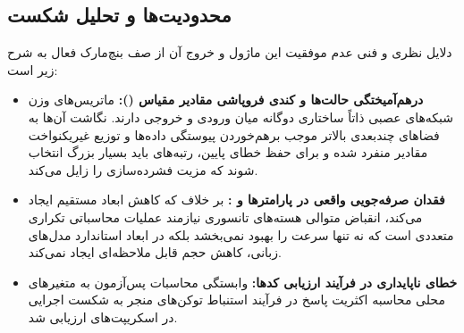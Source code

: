 \subsection{محدودیت‌ها و تحلیل شکست}
دلایل نظری و فنی عدم موفقیت این ماژول و خروج آن از صف بنچ‌مارک فعال به شرح زیر است:
\begin{itemize}
    \item \textbf{درهم‌آمیختگی حالت‌ها و کندی فروپاشی مقادیر مقیاس ():} ماتریس‌های وزن شبکه‌های عصبی ذاتاً ساختاری دوگانه میان ورودی و خروجی دارند. نگاشت آن‌ها به فضاهای چندبعدی بالاتر موجب برهم‌خوردن پیوستگی داده‌ها و توزیع غیریکنواخت مقادیر منفرد شده و برای حفظ خطای پایین، رتبه‌های  باید بسیار بزرگ انتخاب شوند که مزیت فشرده‌سازی را زایل می‌کند.
    \item \textbf{فقدان صرفه‌جویی واقعی در پارامترها و :} بر خلاف  که کاهش ابعاد مستقیم ایجاد می‌کند، انقباض متوالی هسته‌های تانسوری نیازمند عملیات محاسباتی تکراری متعددی است که نه تنها سرعت را بهبود نمی‌بخشد بلکه در ابعاد استاندارد مدل‌های زبانی، کاهش حجم قابل ملاحظه‌ای ایجاد نمی‌کند.
    \item \textbf{خطای ناپایداری در فرآیند ارزیابی کدها:} وابستگی محاسبات پس‌آزمون به متغیرهای محلی محاسبه اکثریت پاسخ در فرآیند استنباط توکن‌های  منجر به شکست اجرایی در اسکریپت‌های ارزیابی شد.
\end{itemize}
